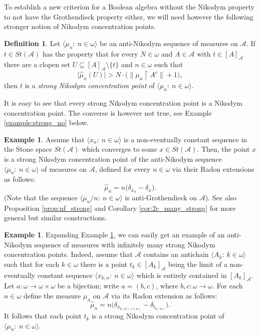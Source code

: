 \documentclass[a4paper,11pt,fleqn]{amsart}
\theoremstyle{definition}
\newtheorem{definition}[theorem]{Definition}
\newtheorem{example}[theorem]{Example}
\theoremstyle{remark}
\numberwithin{equation}{section}
\newcommand{\N}{\mathbb{N}}
\newcommand{\aA}{\mathcal{A}}
\newcommand{\rstr}{\restriction}
\newcommand{\sm}{\setminus}
\newcommand{\sub}{\subseteq}
\newcommand{\wh}{\widehat}
\newcommand{\seqn}[1]{\big\langle#1\colon\ n\io\big\rangle}
\newcommand{\seqk}[1]{\big\langle#1\colon\ k\io\big\rangle}
\newcommand{\clopen}[1]{\left[#1\right]}
\newcommand{\iA}{\in\aA}
\newcommand{\io}{\in\omega}%
\begin{document}
To establish a new criterion for a Boolean algebra without the Nikodym property to not have the Grothendieck property either, we will need however the following stronger notion of Nikodym concentration points.

\begin{definition}\label{def:strong_nik_cp}
    Let $\seqn{\mu_n}$ be an anti-Nikodym sequence of measures on $\aA$. If $t\in St(\aA)$ has the property that for every $N\io$ and $A\iA$ with $t\in\clopen{A}_\aA$ there are a clopen set $U\sub \clopen{A}_\aA\sm\{t\}$ and $n\io$ such that
\[\big|\wh{\mu}_n(U)\big|>N\cdot\Big(\big\|\mu_n\rstr A^c\big\|+1\Big),\]
    then $t$ is a \textit{strong Nikodym concentration point} of $\seqn{\mu_n}$.
\end{definition}

It is easy to see that every strong Nikodym concentration point is a Nikodym concentration point. The converse is however not true, see Example \ref{example:strong_no} below.

\begin{example}\label{example:strong_conv_seq}
    Assume that $\seqn{x_n}$ is a non-eventually constant sequence in the Stone space $St(\aA)$ which converges to some $x\in St(\aA)$. Then, the point $x$ is a strong Nikodym concentration point of the anti-Nikodym sequence $\seqn{\mu_n}$ of measures on $\aA$, defined for every $n\io$ via their Radon extensions as follows:
    \[\wh{\mu}_n=n\big(\delta_{x_n}-\delta_x\big).\]
    (Note that the sequence $\seqn{\mu_n/n}$ is anti-Grothendieck on $\aA$). See also Proposition \ref{prop:nf_strong} and Corollary \ref{cor:2c_many_strong} for more general but similar constructions.
\end{example}

\begin{example}\label{example:many_strong}
    Expanding Example \ref{example:strong_conv_seq}, we can easily get an example of an anti-Nikodym sequence of measures with infinitely many strong Nikodym concentration points. Indeed, assume that $\aA$ contains an antichain $\seqk{A_k}$ such that for each $k\io$ there is a point $t_k\in\clopen{A_k}_\aA$ being the limit of a non-eventually constant sequence $\seqn{x_{k,n}}$ which is entirely contained in $\clopen{A_k}_\aA$. Let $a\colon\omega\to\omega\times\omega$ be a bijection; write $a=(b,c)$, where $b,c\colon\omega\to\omega$. For each $n\io$ define the measure $\mu_n$ on $\aA$ via its Radon extension as follows:
    \[\wh{\mu}_n=n\Big(\delta_{x_{b(n),c(n)}}-\delta_{t_{b(n)}}\Big).\]
    It follows that each point $t_k$ is a strong Nikodym concentration point of $\seqn{\mu_n}$.
\end{example}
\end{document}
